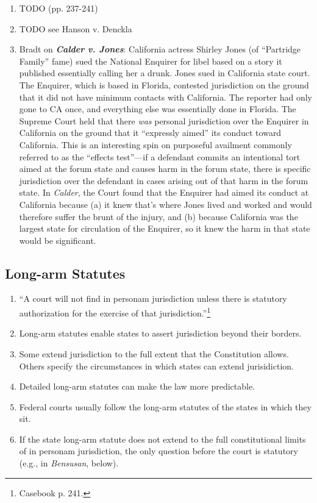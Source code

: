 \begin{enumerate}
    \item TODO (pp. 237-241)
    \item TODO see Hanson v. Denckla
    \item Bradt on \textbf{\emph{Calder v. Jones}}: California actress Shirley Jones (of ``Partridge Family'' fame) sued the National Enquirer for libel based on a story it published essentially calling her a drunk.  Jones sued in California state court.  The Enquirer, which is based in Florida, contested jurisdiction on the ground that it did not have minimum contacts with California.  The reporter had only gone to CA once, and everything else was essentially done in Florida.  The Supreme Court held that there \emph{was} personal jurisdiction over the Enquirer in California on the ground that it ``expressly aimed'' its conduct toward California.  This is an interesting spin on purposeful availment commonly referred to as the ``effects test''---if a defendant commits an intentional tort aimed at the forum state and causes harm in the forum state, there is specific jurisdiction over the defendant in cases arising out of that harm in the forum state.  In \emph{Calder}, the Court found that the Enquirer had aimed its conduct at California because (a) it knew that's where Jones lived and worked and would therefore suffer the brunt of the injury, and (b) because California was the largest state for circulation of the Enquirer, so it knew the harm in that state would be significant.  
\end{enumerate}

\subsection{Long-arm Statutes}

\begin{enumerate}
    \item ``A court will not find in personam jurisdiction unless there is statutory authorization for the exercise of that jurisdiction.''\footnote{Casebook p. 241.}
    \item Long-arm statutes enable states to assert jurisdiction beyond their borders.
    \item Some extend jurisdiction to the full extent that the Constitution allows. Others specify the circumstances in which states can extend jurisidiction.
    \item Detailed long-arm statutes can make the law more predictable.
    \item Federal courts usually follow the long-arm statutes of the states in which they sit.
    \item If the state long-arm statute does not extend to the full constitutional limits of in personam jurisdiction, the only question before the court is statutory (e.g., in \emph{Bensusan}, below).

\end{enumerate}

